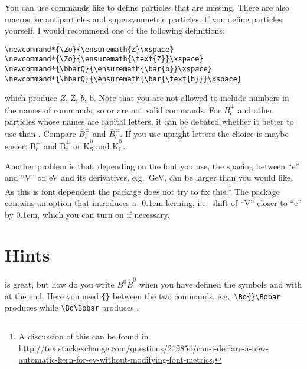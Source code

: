 You can use commands like  to define particles that are missing.
There are also macros for antiparticles and supersymmetric particles.
If you define particles yourself,
I would recommend one of the following definitions:
\begin{verbatim}
\newcommand*{\Zo}{\ensuremath{Z}\xspace}
\newcommand*{\Zo}{\ensuremath{\text{Z}}\xspace}
\newcommand*{\bbarQ}{\ensuremath{\bar{b}}\xspace}
\newcommand*{\bbarQ}{\ensuremath{\bar{\text{b}}}\xspace}
\end{verbatim}%
which produce \ensuremath{Z}, \ensuremath{\text{Z}},
\ensuremath{\bar{b}}, \ensuremath{\bar{\text{b}}}. Note that you are
not allowed to include numbers in the names of commands, so
 or  are not valid commands. For
\(\overline{B}^{\pm}_{c}\) and other particles whose names are capital
letters, it can be debated whether it better to use
 than
. Compare \(\overline{B}^{\pm}_{c}\) and
\(\bar{B}^{\pm}_{c}\). If you use upright letters the choice is maybe
easier: \(\overline{\text{B}}^{\pm}_{\text{c}}\) and
\(\bar{\text{B}}^{\pm}_{\text{c}}\) or
\(\overline{\text{K}}^{0}_{\text{S}}\) and
\(\bar{\text{K}}^{0}_{\text{L}}\).

Another problem is that, depending on the font you use, the spacing between \enquote{e} and \enquote{V}
on \si{\eV} and its derivatives, e.g.\ \si{\GeV}, can be larger than you would like.
As this is font dependent the  package does not try to fix this.\footnote{%
A discussion of this can be found in
\url{http://tex.stackexchange.com/questions/219854/can-i-declare-a-new-automatic-kern-for-ev-without-modifying-font-metrics}.}
The  package contains an option  that introduces a -0.1em kerning,
i.e.\ shift of \enquote{V} closer to \enquote{e} by 0.1em, which you can turn on if necessary.


\section{Hints}%
\label{sec:tips:hints}

 is great, but how do you write \(B^{0}\bar{B}^{0}\) when
you have defined the symbols  and  with
 at the end. Here you need \verb+{}+ between the two
commands, e.g.\ \verb+\Bo{}\Bobar+ produces \Bo{}\Bobar while
\verb+\Bo\Bobar+ produces \Bo\Bobar.

